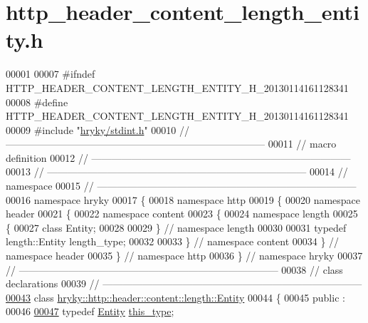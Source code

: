 \hypertarget{http__header__content__length__entity_8h_source}{\section{http\-\_\-header\-\_\-content\-\_\-length\-\_\-entity.\-h}
}

\begin{DoxyCode}
00001 
00007 \textcolor{preprocessor}{#ifndef HTTP\_HEADER\_CONTENT\_LENGTH\_ENTITY\_H\_20130114161128341}
00008 \textcolor{preprocessor}{}\textcolor{preprocessor}{#define HTTP\_HEADER\_CONTENT\_LENGTH\_ENTITY\_H\_20130114161128341}
00009 \textcolor{preprocessor}{}\textcolor{preprocessor}{#include "\hyperlink{stdint_8h}{hryky/stdint.h}"}
00010 \textcolor{comment}{//
      ------------------------------------------------------------------------------}
00011 \textcolor{comment}{// macro definition}
00012 \textcolor{comment}{//
      ------------------------------------------------------------------------------}
00013 \textcolor{comment}{//
      ------------------------------------------------------------------------------}
00014 \textcolor{comment}{// namespace}
00015 \textcolor{comment}{//
      ------------------------------------------------------------------------------}
00016 \textcolor{keyword}{namespace }hryky
00017 \{
00018 \textcolor{keyword}{namespace }http
00019 \{
00020 \textcolor{keyword}{namespace }header
00021 \{
00022 \textcolor{keyword}{namespace }content
00023 \{
00024 \textcolor{keyword}{namespace }length
00025 \{
00027     \textcolor{keyword}{class }Entity;
00028 
00029 \} \textcolor{comment}{// namespace length}
00030 
00031 \textcolor{keyword}{typedef} length::Entity length\_type;
00032 
00033 \} \textcolor{comment}{// namespace content}
00034 \} \textcolor{comment}{// namespace header}
00035 \} \textcolor{comment}{// namespace http}
00036 \} \textcolor{comment}{// namespace hryky}
00037 \textcolor{comment}{//
      ------------------------------------------------------------------------------}
00038 \textcolor{comment}{// class declarations}
00039 \textcolor{comment}{//
      ------------------------------------------------------------------------------}
\hypertarget{http__header__content__length__entity_8h_source_l00043}{}\hyperlink{classhryky_1_1http_1_1header_1_1content_1_1length_1_1_entity}{00043} \textcolor{comment}{}\textcolor{keyword}{class }\hyperlink{classhryky_1_1http_1_1header_1_1content_1_1length_1_1_entity}{hryky::http::header::content::length::Entity}
00044 \{
00045 \textcolor{keyword}{public} :
00046 
\hypertarget{http__header__content__length__entity_8h_source_l00047}{}\hyperlink{classhryky_1_1http_1_1header_1_1content_1_1length_1_1_entity_aafaa68899d88e773bb1aba75625e397d}{00047}     \textcolor{keyword}{typedef} \hyperlink{classhryky_1_1http_1_1header_1_1content_1_1length_1_1_entity}{Entity} \hyperlink{classhryky_1_1http_1_1header_1_1content_1_1length_1_1_entity_aafaa68899d88e773bb1aba75625e397d}{this_type};

\end{DoxyCode}
